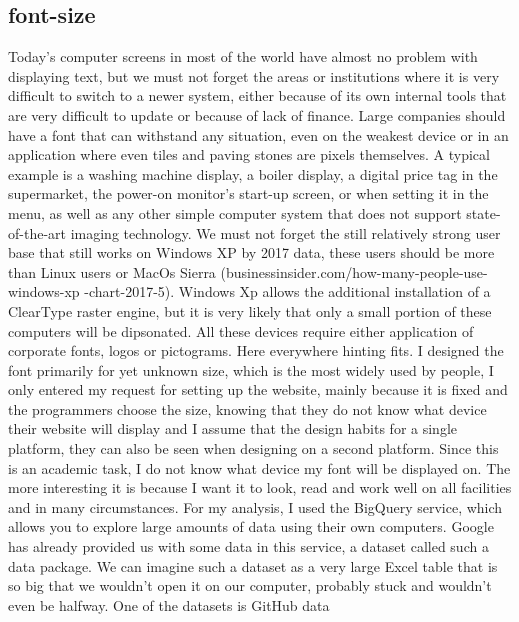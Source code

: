 \documentclass[a4paper]{article}
\begin{document}
\subsection{font-size}
Today's computer screens in most of the world have almost no problem with displaying text, but we must not forget the areas or institutions where it is very difficult to switch to a newer system, either because of its own internal tools that are very difficult to update or because of lack of finance. Large companies should have a font that can withstand any situation, even on the weakest device or in an application where even tiles and paving stones are pixels themselves. A typical example is a washing machine display, a boiler display, a digital price tag in the supermarket, the power-on monitor's start-up screen, or when setting it in the menu, as well as any other simple computer system that does not support state-of-the-art imaging technology. We must not forget the still relatively strong user base that still works on Windows XP by 2017 data, these users should be more than Linux users or MacOs Sierra (businessinsider.com/how-many-people-use-windows-xp -chart-2017-5). Windows Xp allows the additional installation of a ClearType raster engine, but it is very likely that only a small portion of these computers will be dipsonated. All these devices require either application of corporate fonts, logos or pictograms. Here everywhere hinting fits. I designed the font primarily for yet unknown size, which is the most widely used by people, I only entered my request for setting up the website, mainly because it is fixed and the programmers choose the size, knowing that they do not know what device their website will display and I assume that the design habits for a single platform, they can also be seen when designing on a second platform. Since this is an academic task, I do not know what device my font will be displayed on. The more interesting it is because I want it to look, read and work well on all facilities and in many circumstances. For my analysis, I used the BigQuery service, which allows you to explore large amounts of data using their own computers. Google has already provided us with some data in this service, a dataset called such a data package. We can imagine such a dataset as a very large Excel table that is so big that we wouldn't open it on our computer, probably stuck and wouldn't even be halfway. One of the datasets is GitHub data 
\end{document}
